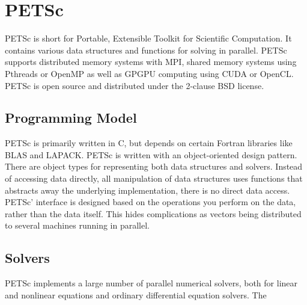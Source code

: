 \section{PETSc}

PETSc is short for Portable, Extensible Toolkit for Scientific Computation. 
It contains various data structures and functions for 
solving  in parallel. PETSc supports distributed 
memory systems with MPI, shared memory systems using Pthreads or OpenMP as well 
as GPGPU computing using CUDA or OpenCL. PETSc is open source and distributed 
under the 2-clause BSD license\cite{petsc-web-page}.

\subsection{Programming Model}
PETSc is primarily written in C, but depends on certain Fortran libraries like BLAS 
and LAPACK. PETSc is written with an object-oriented design pattern.
There are object types for representing both data structures and solvers.
Instead of accessing data directly, all manipulation of data structures uses functions
that abstracts away the underlying implementation, there is no direct data access. 
PETSc' interface is designed based on the operations you perform on the data, rather 
than the data itself. This hides complications as vectors being distributed to 
several machines running in parallel.

\subsection{Solvers}
PETSc implements a large number of parallel numerical solvers, both for linear and 
nonlinear equations and ordinary differential equation solvers. The 
